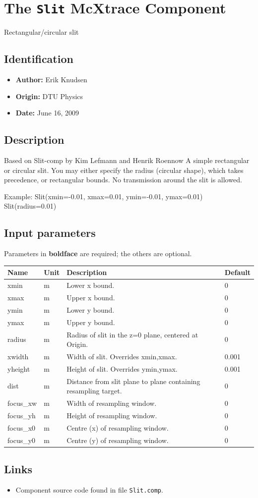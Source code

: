 \section{The \texttt{Slit} McXtrace Component}
Rectangular/circular slit

\subsection*{Identification}
\begin{itemize}
  \item \textbf{Author:} Erik Knudsen
  \item \textbf{Origin:} DTU Physics
  \item \textbf{Date:} June 16, 2009
\end{itemize}

\subsection*{Description}
Based on Slit-comp by Kim Lefmann and Henrik Roennow A simple rectangular or circular slit. You may either specify the radius (circular shape), which takes precedence, or rectangular bounds. No transmission around the slit is allowed.

Example: Slit(xmin=-0.01, xmax=0.01, ymin=-0.01, ymax=0.01) Slit(radius=0.01)

\subsection*{Input parameters}
Parameters in \textbf{boldface} are required; the others are optional.

\begin{longtable}{p{}p{}p{}p{}}
\toprule
\textbf{Name} & \textbf{Unit} & \textbf{Description} & \textbf{Default} \\
\midrule
\endhead
xmin & m & Lower x bound. & 0 \\
xmax & m & Upper x bound. & 0 \\
ymin & m & Lower y bound. & 0 \\
ymax & m & Upper y bound. & 0 \\
radius & m & Radius of slit in the z=0 plane, centered at Origin. & 0 \\
xwidth & m & Width of slit. Overrides xmin,xmax. & 0.001 \\
yheight & m & Height of slit. Overrides ymin,ymax. & 0.001 \\
dist & m & Distance from slit plane to plane containing resampling target. & 0 \\
focus\_xw & m & Width of resampling window. & 0 \\
focus\_yh & m & Height of resampling window. & 0 \\
focus\_x0 & m & Centre (x) of resampling window. & 0 \\
focus\_y0 & m & Centre (y) of resampling window. & 0 \\
\bottomrule
\end{longtable}

\subsection*{Links}
\begin{itemize}
  \item Component source code found in file \texttt{Slit.comp}.
\end{itemize}

